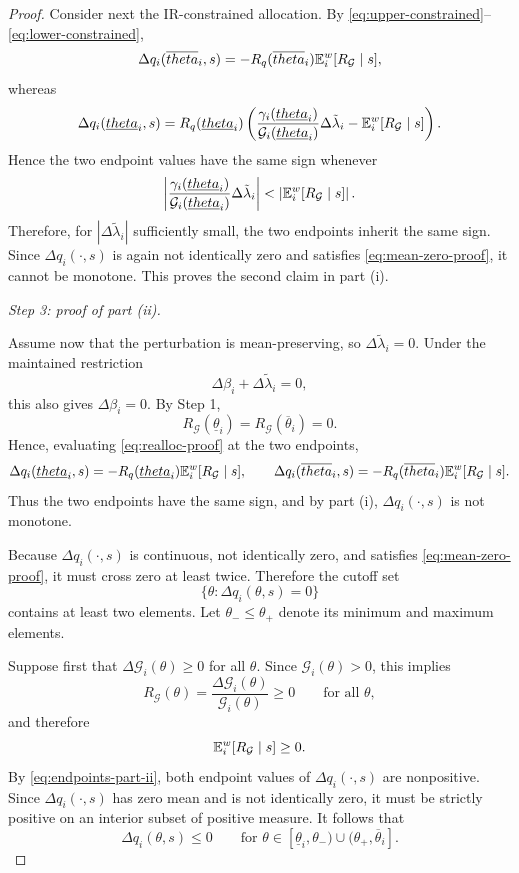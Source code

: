 \documentclass[master.tex]{subfiles}
\begin{document}
\begin{proof}
Consider next the IR-constrained allocation. By \eqref{eq:upper-constrained}--\eqref{eq:lower-constrained},
\[
\Delta q_i(\overline{theta}_i,s)
=
-
R_q(\overline{theta}_i)\mathbb{E}_i^w[R_{\mathcal G}\mid s],
\]
whereas
\[
\Delta q_i(\underline{theta}_i,s)
=
R_q(\underline{theta}_i)
\left(
\frac{\gamma_i(\underline{theta}_i)}{\mathcal G_i(\underline{theta}_i)}\Delta\tilde\lambda_i
-
\mathbb{E}_i^w[R_{\mathcal G}\mid s]
\right).
\]
Hence the two endpoint values have the same sign whenever
\[
\left|
\frac{\gamma_i(\underline{theta}_i)}{\mathcal G_i(\underline{theta}_i)}
\Delta\tilde\lambda_i
\right|
<
\left|
\mathbb{E}_i^w[R_{\mathcal G}\mid s]
\right|.
\]
Therefore, for $|\Delta\tilde\lambda_i|$ sufficiently small, the two endpoints inherit the same sign. Since $\Delta q_i(\cdot,s)$ is again not identically zero and satisfies \eqref{eq:mean-zero-proof}, it cannot be monotone. This proves the second claim in part (i).


\noindent\textit{Step 3: proof of part (ii).}

Assume now that the perturbation is mean-preserving, so $\Delta\tilde\lambda_i=0$. Under the maintained restriction
\[
\Delta\beta_i+\Delta\tilde\lambda_i=0,
\]
this also gives $\Delta\beta_i=0$. By Step 1,
\[
R_{\mathcal G}(\underline\theta_i)=R_{\mathcal G}(\overline\theta_i)=0.
\]
Hence, evaluating \eqref{eq:realloc-proof} at the two endpoints,
\begin{equation}\label{eq:endpoints-part-ii}
\Delta q_i(\underline{theta}_i,s)
=
-
R_q(\underline{theta}_i)\mathbb{E}_i^w[R_{\mathcal G}\mid s],
\qquad
\Delta q_i(\overline{theta}_i,s)
=
-
R_q(\overline{theta}_i)\mathbb{E}_i^w[R_{\mathcal G}\mid s].
\end{equation}
Thus the two endpoints have the same sign, and by part (i), $\Delta q_i(\cdot,s)$ is not monotone.

Because $\Delta q_i(\cdot,s)$ is continuous, not identically zero, and satisfies \eqref{eq:mean-zero-proof}, it must cross zero at least twice. Therefore the cutoff set
\[
\{\theta:\Delta q_i(\theta,s)=0\}
\]
contains at least two elements. Let $\theta_-\le \theta_+$ denote its minimum and maximum elements.

Suppose first that $\Delta\mathcal G_i(\theta)\ge 0$ for all $\theta$. Since $\mathcal G_i(\theta)>0$, this implies
\[
R_{\mathcal G}(\theta)=\frac{\Delta\mathcal G_i(\theta)}{\mathcal G_i(\theta)}\ge 0
\qquad
\text{for all }\theta,
\]
and therefore
\[
\mathbb{E}_i^w[R_{\mathcal G}\mid s]\ge 0.
\]
By \eqref{eq:endpoints-part-ii}, both endpoint values of $\Delta q_i(\cdot,s)$ are nonpositive. Since $\Delta q_i(\cdot,s)$ has zero mean and is not identically zero, it must be strictly positive on an interior subset of positive measure. It follows that
\[
\Delta q_i(\theta,s)\le 0
\qquad
\text{for }\theta\in[\underline\theta_i,\theta_-)\cup(\theta_+,\overline\theta_i].
\]


\end{proof}
\end{document}

